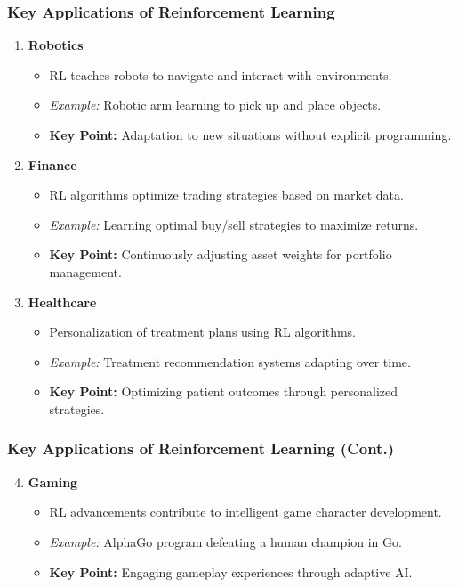 \documentclass{beamer}
\begin{document}
\begin{frame}[fragile]
    \frametitle{Key Applications of Reinforcement Learning}
    \begin{enumerate}
        \item \textbf{Robotics}
        \begin{itemize}
            \item RL teaches robots to navigate and interact with environments.
            \item \textit{Example:} Robotic arm learning to pick up and place objects.
            \item \textbf{Key Point:} Adaptation to new situations without explicit programming.
        \end{itemize}
        
        \item \textbf{Finance}
        \begin{itemize}
            \item RL algorithms optimize trading strategies based on market data.
            \item \textit{Example:} Learning optimal buy/sell strategies to maximize returns.
            \item \textbf{Key Point:} Continuously adjusting asset weights for portfolio management.
        \end{itemize}
        
        \item \textbf{Healthcare}
        \begin{itemize}
            \item Personalization of treatment plans using RL algorithms.
            \item \textit{Example:} Treatment recommendation systems adapting over time.
            \item \textbf{Key Point:} Optimizing patient outcomes through personalized strategies.
        \end{itemize}
    \end{enumerate}
\end{frame}

\begin{frame}[fragile]
    \frametitle{Key Applications of Reinforcement Learning (Cont.)}
    \begin{enumerate}
        \setcounter{enumi}{3}
        \item \textbf{Gaming}
        \begin{itemize}
            \item RL advancements contribute to intelligent game character development.
            \item \textit{Example:} AlphaGo program defeating a human champion in Go.
            \item \textbf{Key Point:} Engaging gameplay experiences through adaptive AI.
        \end{itemize}
    \end{enumerate}
\end{frame}
\end{document}
